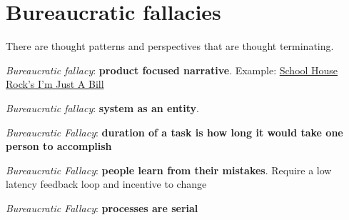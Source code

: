 \section{Bureaucratic fallacies}

There are thought patterns and perspectives that are \gls{thought terminating}. 

\textit{Bureaucratic fallacy}: \textbf{product focused narrative}. Example: \href{https://www.youtube.com/watch?v=OgVKvqTItto}{School House Rock's I'm Just A Bill}

\textit{Bureaucratic fallacy}: \textbf{system as an entity}. \cite{2002_Gall}

\textit{Bureaucratic Fallacy}: \textbf{duration of a task is how long it would take one person to accomplish}

\textit{Bureaucratic Fallacy}: \textbf{people learn from their mistakes}. Require a low latency feedback loop and incentive to change

\textit{Bureaucratic Fallacy}: \textbf{processes are serial}